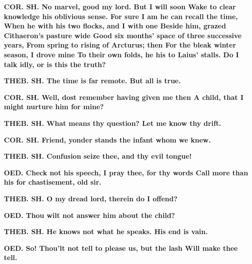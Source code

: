 \documentclass[11pt,letter]{book}
\begin{document}
\par \textbf{COR. SH. No marvel, good my lord. But I will soon Wake to clear knowledge his oblivious sense. For sure I am he can recall the time, When he with his two flocks, and I with one Beside him, grazed Cithaeron’s pasture wide Good six months’ space of three successive years, From spring to rising of Arcturus; then For the bleak winter season, I drove mine To their own folds, he his to Laius’ stalls. Do I talk idly, or is this the truth?}
\par 

\par \textbf{THEB. SH. The time is far remote. But all is true.}
\par 

\par \textbf{COR. SH. Well, dost remember having given me then A child, that I might nurture him for mine?}
\par 

\par \textbf{THEB. SH. What means thy question? Let me know thy drift.}
\par 

\par \textbf{COR. SH. Friend, yonder stands the infant whom we knew.}
\par 

\par \textbf{THEB. SH. Confusion seize thee, and thy evil tongue!}
\par 

\par \textbf{OED. Check not his speech, I pray thee, for thy words Call more than his for chastisement, old sir.}
\par 

\par \textbf{THEB. SH. O my dread lord, therein do I offend?}
\par 

\par \textbf{OED. Thou wilt not answer him about the child?}
\par 

\par \textbf{THEB. SH. He knows not what he speaks. His end is vain.}
\par 

\par \textbf{OED. So! Thou’lt not tell to please us, but the lash Will make thee tell.}
\par 
\end{document}

